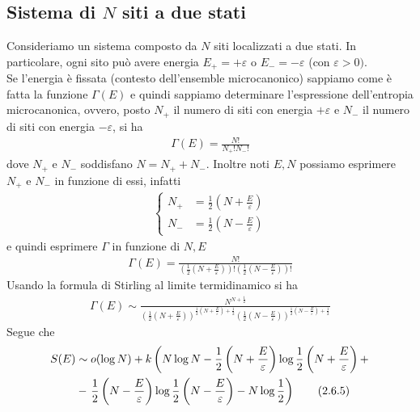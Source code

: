 \documentclass{article}
\begin{document}
\newpage
\subsection{Sistema di $N$ siti a due stati}
Consideriamo un sistema composto da $N$ siti localizzati a due stati. In particolare, ogni sito può avere energia $E_+ = +\varepsilon$ o $E_- = -\varepsilon$ (con $\varepsilon > 0)$. \\
Se l'energia è fissata (contesto dell'ensemble microcanonico) sappiamo come è fatta la funzione $\Gamma(E)$ e quindi sappiamo determinare l'espressione dell'entropia microcanonica, ovvero, posto $N_+$ il numero di siti con energia $+\varepsilon$ e $N_-$ il numero di siti con energia $-\varepsilon$, si ha 
\begin{align}
    \Gamma(E) = \frac{N!}{N_+!N_-!} \tag{2.6.1}
\end{align}
dove $N_+$ e $N_-$ soddisfano $N = N_+ + N_-$. Inoltre noti $E, N$ possiamo esprimere $N_+$ e $N_-$ in funzione di essi, infatti 
\begin{align}
    \begin{cases}
        N_+ &= \frac{1}{2}\left(N + \frac{E}{\varepsilon}\right) \\
        N_- &= \frac{1}{2}\left(N - \frac{E}{\varepsilon}\right) 
    \end{cases} \tag{2.6.2}
\end{align}
e quindi esprimere $\Gamma$ in funzione di $N, E$ 
\begin{align}
    \Gamma(E) = \frac{N!}{\left(\frac{1}{2}\left(N + \frac{E}{\varepsilon}\right)\right)!\left(\frac{1}{2}\left(N - \frac{E}{\varepsilon}\right)\right)!} \tag{2.6.3}
\end{align}
Usando la formula di Stirling al limite termidinamico si ha 
\begin{align}
    \Gamma(E) \sim \frac{N^{N + \frac{1}{2}}}{\left(\frac{1}{2}\left(N + \frac{E}{\varepsilon}\right)\right)^{\frac{1}{2}\left(N + \frac{E}{\varepsilon}\right) + \frac{1}{2}}\left(\frac{1}{2}\left(N - \frac{E}{\varepsilon}\right)\right)^{\frac{1}{2}\left(N - \frac{E}{\varepsilon}\right) + \frac{1}{2}}} \tag{2.6.4}
\end{align}
Segue che 
\begin{align}
    S(E) &\sim o(\log N) + k\left(N\log N - \frac{1}{2}\left(N + \frac{E}{\varepsilon}\right)\log\frac{1}{2}\left(N + \frac{E}{\varepsilon}\right) +\right. \notag \\
    &-\left.\frac{1}{2}\left(N - \frac{E}{\varepsilon}\right)\log\frac{1}{2}\left(N - \frac{E}{\varepsilon}\right) - N\log\frac{1}{2}\right) \tag{2.6.5}
\end{align}
\end{document}
